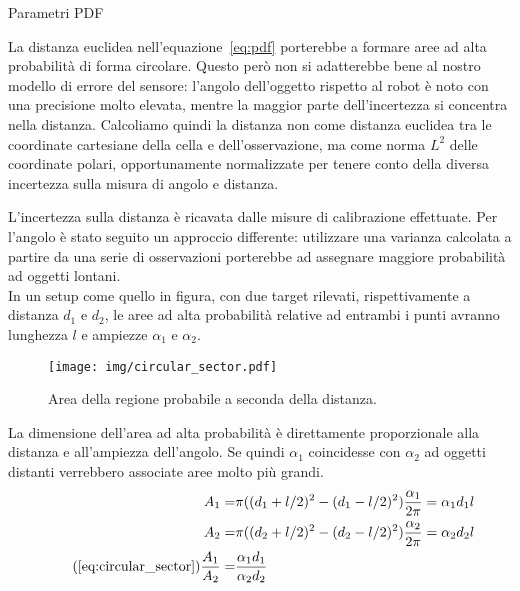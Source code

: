 \documentclass[aspectratio=169, leqno]{beamer}
\begin{document}
	\begin{frame}[allowframebreaks]{Parametri PDF}
	
	La distanza euclidea nell'equazione~\ref{eq:pdf} porterebbe a formare aree ad alta probabilità di forma
	circolare. Questo però non si adatterebbe bene al nostro modello di errore
	del sensore: l'angolo dell'oggetto rispetto al robot è noto con una
	precisione molto elevata, mentre la maggior parte dell'incertezza si
	concentra nella distanza. Calcoliamo quindi la distanza non come distanza
	euclidea tra le coordinate cartesiane della cella e dell'osservazione, ma
	come norma $L^2$ delle coordinate polari, opportunamente normalizzate per
	tenere conto della diversa incertezza sulla misura di angolo e distanza.
	
	\framebreak

	L'incertezza sulla distanza è ricavata dalle misure di calibrazione
	effettuate. Per l'angolo è stato seguito un approccio differente:
	utilizzare una varianza calcolata a partire da una serie di osservazioni
	porterebbe ad assegnare maggiore probabilità ad oggetti lontani. \\ In un
	setup come quello in figura, con due target rilevati, rispettivamente a
	distanza $d_1$ e $d_2$, le aree ad alta probabilità relative ad entrambi i
	punti avranno lunghezza $l$ e ampiezze $ \alpha_1 \text{ e } \alpha_2  $. 
	
	\begin{figure}[H]
		\centering
		\texttt{[image: img/circular\_sector.pdf]}
		\caption{Area della regione probabile a seconda della distanza.}
		\label{fig:circular_sector}
	\end{figure}

	La dimensione dell'area ad alta probabilità è direttamente
	proporzionale alla distanza e all'ampiezza dell'angolo. Se quindi $
	\alpha_1 $ coincidesse con $ \alpha _2 $ ad oggetti distanti verrebbero
	associate aree molto più grandi. 
	\begin{subequations}\label{eq:circular_sector}
	\begin{align*} 
		A_1  = & \pi((d_1+l/2)^2-(d_1-l/2)^2)\frac{\alpha_1}{2\pi}  =  \alpha_1 d_1l \\
		A_2  = & \pi((d_2+l/2)^2-(d_2-l/2)^2)\frac{\alpha_2}{2\pi}  =  \alpha_2 d_2l \\
\tag{\ref{eq:circular_sector}}
		\frac{A_1}{A_2} = & \frac	{\alpha_1 d_1} {\alpha_2 d_2}
	\end{align*}
	\end{subequations}
	

\end{frame}
\end{document}
